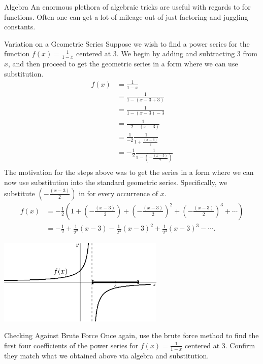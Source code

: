 \begin{subsection}{Algebra} An enormous plethora of algebraic tricks are useful with regards to  for functions.  Often one can get a lot of mileage out of just factoring and juggling constants.

\begin{example}{Variation on a Geometric Series}
Suppose we wish to find a power series for the function $f(x)=\frac{1}{1-x}$ centered at 3.  We begin by adding and subtracting 3 from $x$, and then proceed to get the geometric series in a form where we can use substitution. \begin{align*}
f(x)&=\frac{1}{1-x}\\
&=\frac{1}{1-\left(x-3+3\right)}\\
&=\frac{1}{1-\left(x-3\right)-3}\\
&=\frac{1}{-2-\left(x-3\right)}\\
&=\frac{1}{-2}\frac{1}{1+\frac{\left(x-3\right)}{2}}\\
&=-\frac{1}{2}\frac{1}{1-\left(-\frac{\left(x-3\right)}{2}\right)}\\
\end{align*}
The motivation for the steps above was to get the series in a form where we can now use substitution into the standard geometric series. Specifically, we substitute $\left(-\frac{\left(x-3\right)}{2}\right)$ in for every occurrence of $x$.  
\begin{align*}
f(x)&=-\frac{1}{2}\left(1+\left(-\frac{\left(x-3\right)}{2}\right)+\left(-\frac{\left(x-3\right)}{2}\right)^2+\left(-\frac{\left(x-3\right)}{2}\right)^3+\cdots\right) \\
&=-\frac{1}{2}+\frac{1}{2^2}\left(x-3\right)-\frac{1}{2^3}\left(x-3\right)^2+\frac{1}{2^4}\left(x-3\right)^3-\cdots.
\end{align*}

\begin{center}
	\includegraphics[width=300px]{ChapterPowerSeries/Figures/IntofConverg}
\end{center}
\end{example}
\begin{exercise}{Checking Against Brute Force \Coffeecup}
Once again, use the brute force method to find the first four coefficients of the power series for $f(x)=\frac{1}{1-x}$ centered at 3.  Confirm they match what we obtained above via algebra and substitution. \vspace*{2in}
\end{exercise}


\end{subsection}
